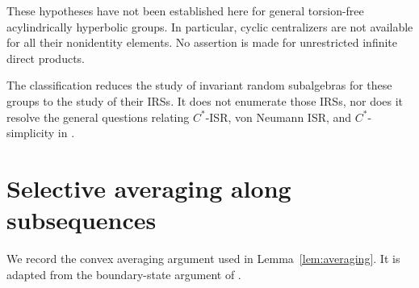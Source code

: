 \documentclass[11pt,letterpaper]{amsart}
\numberwithin{equation}{section}
\theoremstyle{definition}
\theoremstyle{remark}
\begin{document}
These hypotheses have not been established here for general
torsion-free acylindrically hyperbolic groups. In particular, cyclic
centralizers are not available for all their nonidentity elements.
No assertion is made for unrestricted infinite direct products.

The classification reduces the study of invariant random subalgebras
for these groups to the study of their IRSs. It does not enumerate
those IRSs, nor does it resolve the general
questions relating $C^*$-ISR, von Neumann ISR, and $C^*$-simplicity in
\cite[Questions~6.11--6.12]{AJ}.

\appendix
\section{Selective averaging along subsequences}\label{app:averaging}

We record the convex averaging argument used in
Lemma~\ref{lem:averaging}. It is adapted from the boundary-state
argument of \cite[Lemma~3.1 and Proposition 3.2]{AJ}.
\end{document}
